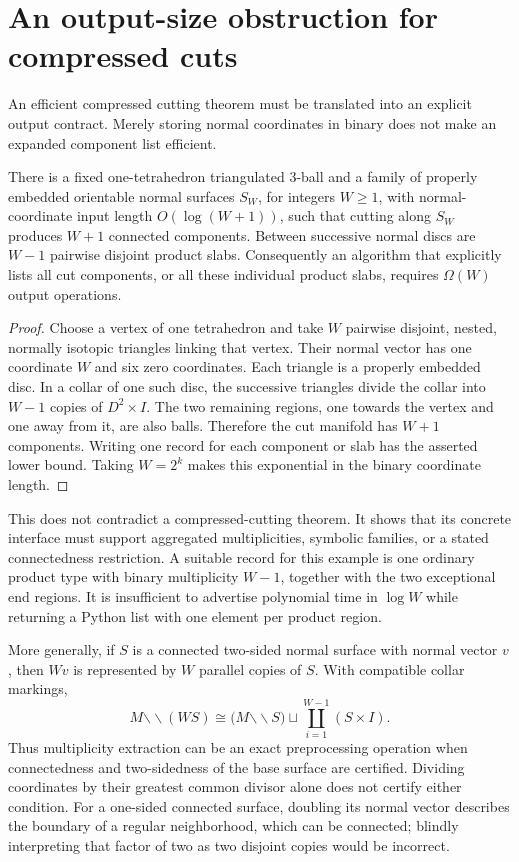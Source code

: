 \section{An output-size obstruction for compressed cuts}
\label{sec:compressed-cut-output}

An efficient compressed cutting theorem must be translated into an
explicit output contract.  Merely storing normal coordinates in binary
does not make an expanded component list efficient.

\begin{proposition}
\label{prop:parallel-disc-output}
There is a fixed one-tetrahedron triangulated 3-ball and a family of
properly embedded orientable normal surfaces $S_W$, for integers $W\ge1$,
with normal-coordinate input length $O(\log(W+1))$, such that cutting
along $S_W$ produces $W+1$ connected components.  Between successive
normal discs are $W-1$ pairwise disjoint product slabs.  Consequently an
algorithm that explicitly lists all cut components, or all these
individual product slabs, requires $\Omega(W)$ output operations.
\end{proposition}

\begin{proof}
Choose a vertex of one tetrahedron and take $W$ pairwise disjoint,
nested, normally isotopic triangles linking that vertex.  Their normal
vector has one coordinate $W$ and six zero coordinates.  Each triangle
is a properly embedded disc.  In a collar of one such disc, the
successive triangles divide the collar into $W-1$ copies of
$D^2\times I$.  The two remaining regions, one towards the vertex and
one away from it, are also balls.  Therefore the cut manifold has
$W+1$ components.  Writing one record for each component or slab has
the asserted lower bound.  Taking $W=2^k$ makes this exponential in
the binary coordinate length.
\end{proof}

This does not contradict a compressed-cutting theorem.  It shows that
its concrete interface must support aggregated multiplicities,
symbolic families, or a stated connectedness restriction.  A suitable
record for this example is one ordinary product type with binary
multiplicity $W-1$, together with the two exceptional end regions.
It is insufficient to advertise polynomial time in $\log W$ while
returning a Python list with one element per product region.

More generally, if $S$ is a connected two-sided normal surface with
normal vector $v$, then $Wv$ is represented by $W$ parallel copies of
$S$.  With compatible collar markings,
\[
 M\mathbin{\backslash\!\backslash}(WS)
 \cong
 \bigl(M\mathbin{\backslash\!\backslash}S\bigr)
 \sqcup
 \coprod_{i=1}^{W-1}(S\times I).
\]
Thus multiplicity extraction can be an exact preprocessing operation
when connectedness and two-sidedness of the base surface are certified.
Dividing coordinates by their greatest common divisor alone does not
certify either condition.  For a one-sided connected surface, doubling
its normal vector describes the boundary of a regular neighborhood,
which can be connected; blindly interpreting that factor of two as
two disjoint copies would be incorrect.

